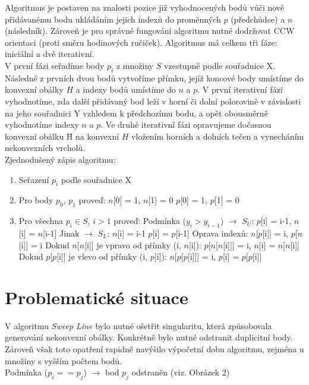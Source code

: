 \documentclass[a4paper, 12pt]{article}
\begin{document}
Algoritmus je postaven na znalosti pozice již vyhodnocených bodů vůči nově přidá\-vanému bodu ukládáním jejich indexů do proměnných $p$ (předchůdce) a $n$ (následník). Zároveň je pro správné fungování algoritmu nutné dodržovat CCW orientaci (proti směru hodinových ručiček). Algoritmus má celkem tři fáze: iniciální a dvě iterativní.\\

V první fázi seřadíme body $p_i$ z množiny $S$ vzestupně podle souřadnice X. Následně z prvních dvou bodů vytvoříme přímku, jejíž koncové body umístíme do konvexní obálky $H$ a indexy bodů umístíme do $n$ a $p$. V první iterativní fázi vyhodnotíme, zda další přidávaný bod leží v horní či dolní polorovině v závislosti na jeho souřadnici Y vzhledem k předchozímu bodu, a opět obousměrně vyhodnotíme indexy $n$ a $p$. Ve druhé iterativní fázi opravujeme dočasnou konvexní obálku \={H} na konvexní $H$ vložením horních a dolních tečen a vynecháním nekonvexních vrcholů.\\

Zjednodušený zápis algoritmu: 
\begin{enumerate}
\item Seřazení $p_i$ podle souřadnice X
\item Pro body $p_0$, $p_1$ proveď:
\subitem $n$[0] = 1, $n$[1] = 0
\subitem $p$[0] = 1, $p$[1] = 0
\item Pro všechna $p_i \in S$, $i > 1$ proveď:
\subitem Podmínka ($y_i > y_{i-1}$) $\rightarrow$ $S_U$: $p$[i] = i-1, $n$[i] = $n$[i-1]
\subitem Jinak $\rightarrow$ $S_L$: $n$[i] = i-1 $p$[i] = $p$[i-1]
\subitem Oprava indexů: $n$[$p$[i]] = i, $p$[$n$[i]] = i
\subitem Dokud $n$[$n$[i]] je vpravo od přímky (i, $n$[i]):
\subsubitem $p$[$n$[$n$[i]]] = i, $n$[i] = $n$[$n$[i]]
\subitem Dokud $p$[$p$[i]] je vlevo od přímky (i, $p$[i]):
\subsubitem $n$[$p$[$p$[i]]] = i, $p$[i] = $p$[$p$[i]]
\end{enumerate}

\section{Problematické situace}
V algoritmu \textit{Sweep Line} bylo nutné ošetřit singularitu, která způsobovala generování nekonvexní obálky. Konkrétně bylo nutné odstranit duplicitní body. Zároveň však toto opatření rapidně navýšilo výpočetní dobu algoritmu, zejména u množiny s vyšším počtem bodů. \\

Podmínka ($p_i == p_j$) $\rightarrow$ bod $p_j$ odstraněn (viz. Obrázek 2)\\
\end{document}
